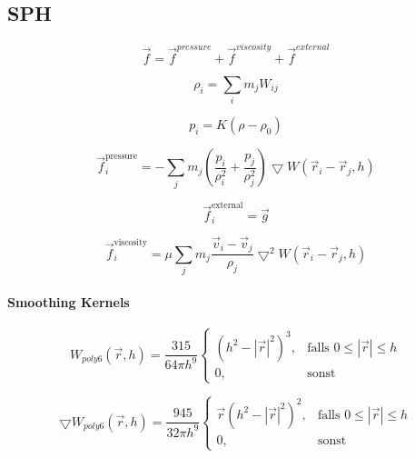 \documentclass[a4paper]{paper}
\begin{document}
\subsection{SPH}

\begin{equation}
\label{force}
\vec{f} = \vec{f}^{pressure} + \vec{f}^{viscosity} + \vec{f}^{external}
\end{equation}


\begin{equation}
\label{density}
\rho_i = \sum_i{m_j W_{ij}}
\end{equation}



\begin{equation}
\label{pressure}
p_i=K(\rho-\rho_0)
\end{equation}

\begin{equation}
\label{force_pressure}
\vec{f}^{\text{pressure}}_{i} = - \sum_{j}m_{j}(\frac{p_{i}}{\rho_{i}^2} +\frac{p_{j}}{\rho_{j}^2})\bigtriangledown W(\vec{r}_{i}-\vec{r}_{j},h)
\end{equation}

\begin{equation}
\label{force_external}
\vec{f}^{\text{external}}_{i} = \vec{g}
\end{equation}

\begin{equation}
\label{force_viscosity}
\vec{f}^{\text{viscosity}}_{i} = \mu \sum_{j}m_{j}\frac{\vec{v}_{i} - \vec{v}_{j}}{\rho_{j}}\bigtriangledown^2 W(\vec{r}_{i}-\vec{r}_{j},h)
\end{equation}

\paragraph{Smoothing Kernels}

\begin{equation}
\label{poly6}
W_{poly6}(\vec{r},h) = \frac{315}{64 \pi h^9} 
\begin{cases}
(h^2-|\vec{r}|^2)^3, & \text{falls } 0 \leq |\vec{r}| \leq h \\
0, & \text{sonst}
\end{cases}
\end{equation}

\begin{equation}
\label{gradient_poly6}
\bigtriangledown W_{poly6}(\vec{r},h) = \frac{945}{32 \pi h^9} 
\begin{cases}
\vec{r}(h^2-|\vec{r}|^2)^2, &\text{falls } 0 \leq |\vec{r}| \leq h  \\
0, & \text{sonst}
\end{cases}
\end{equation}
\end{document}
